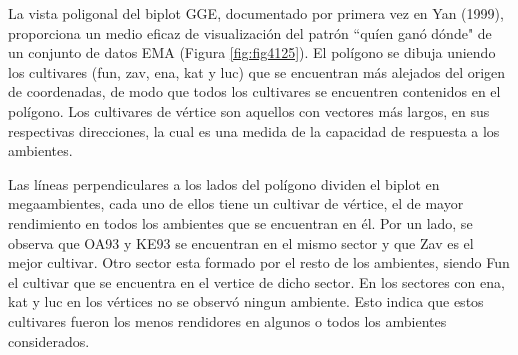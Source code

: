 

La vista poligonal del biplot GGE, documentado por primera vez en Yan (1999), proporciona un medio eficaz de visualización del patrón ``quíen ganó dónde" de un conjunto de datos EMA (Figura \ref{fig:fig4125}). 
El polígono se dibuja uniendo los cultivares (fun, zav, ena, kat y luc) que se encuentran más alejados del origen de coordenadas, de modo que todos los cultivares se encuentren contenidos en el polígono. Los cultivares de vértice son aquellos con  vectores más largos, en sus respectivas direcciones, la cual es una medida de la capacidad de respuesta a los ambientes. 

Las líneas perpendiculares a los lados del polígono dividen el biplot en megaambientes, cada uno de ellos tiene un cultivar de vértice, el de mayor rendimiento en todos los ambientes que se encuentran en él. Por un lado, se observa que OA93 y KE93 se encuentran en el mismo sector y que Zav es el mejor cultivar. Otro sector esta formado por el resto de los ambientes, siendo Fun el cultivar que se encuentra en el vertice de dicho sector. En los sectores con ena, kat y luc en los vértices no se observó ningun ambiente. Esto indica que estos cultivares fueron los menos rendidores en algunos o todos los ambientes considerados.

